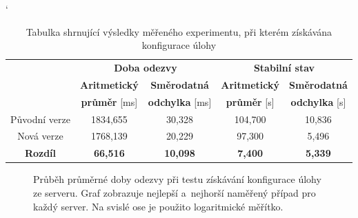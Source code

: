             \begin{table}[ht]
             \catcode`
             \begin{adjustwidth}{-0.5cm}{}
             \begin{center}
              \begin{tabular}{| c || c | c || c | c |} \hline
                \multirow{3}{*}{}  &   \multicolumn{2}{c||}{\textbf{Doba odezvy}}  &  \multicolumn{2}{c|}{\textbf{Stabilní stav}}\\ \cline{2-5}
                 & \textbf{Aritmetický}  &  \textbf{Směrodatná}  &  \textbf{Aritmetický} &  \textbf{Směrodatná}\\ 
                 & \textbf{průměr} [ms]  &  \textbf{odchylka} [ms]  &  \textbf{průměr} [s]  &  \textbf{odchylka} [s]\\ \hline
                Původní verze &  1834,655 &  30,328 &  104,700 & 10,836 \\\hline
                Nová verze &  1768,139 &  20,229 &  97,300 &  5,496\\\hline
                \textbf{Rozdíl} &  \textbf{66,516} &  \textbf{10,098} &  \textbf{7,400} &  \textbf{5,339}\\\hline  
              \end{tabular}
              \caption{Tabulka shrnující výsledky měřeného experimentu, při kterém získávána konfigurace úlohy}
              \label{tabGetFreestyleFinal}
             \end{center}
             \end{adjustwidth}
            \end{table}

            \begin{figure}[h!t]
             \begin{adjustwidth}{-0.5cm}{}
                \begin{center}
                    \caption{Průběh průměrné doby odezvy při testu získávání konfigurace úlohy ze serveru.
                        Graf zobrazuje nejlepší a~nejhorší naměřený případ pro každý server.  
                        Na svislé ose je použito logaritmické měřítko.}
                    \label{imgGetFreestyleCely}
                \end{center}
             \end{adjustwidth}
            \end{figure}

